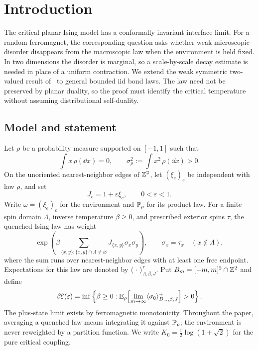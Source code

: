 \section{Introduction}\label{sec:introduction}

The critical planar Ising model has a conformally invariant interface limit.
For a random ferromagnet, the corresponding question asks whether weak
microscopic disorder disappears from the macroscopic law when the environment
is held fixed. In two dimensions the disorder is marginal, so a scale-by-scale
decay estimate is needed in place of a uniform contraction.
We extend the weak symmetric two-valued result of~\cite{R} to general
bounded iid bond laws. The law need not be preserved by planar duality,
so the proof must identify the critical temperature without assuming
distributional self-duality.

\subsection{Model and statement}
Let $\rho$ be a probability measure supported on $[-1,1]$ such that
\begin{equation}\label{eq:law-assumptions}
 \int x\,\rho(\dd x)=0,
 \qquad \sigma_\rho^2:=\int x^2\,\rho(\dd x)>0.
\end{equation}
On the unoriented nearest-neighbor edges of $\mathbb Z^2$, let $(\xi_e)_e$ be
independent with law $\rho$, and set
\begin{equation}\label{eq:bond-model}
 J_e=1+\varepsilon\xi_e,\qquad 0<\varepsilon<1.
\end{equation}
Write $\omega=(\xi_e)_e$ for the environment and $\mathbb P_\rho$ for its product
law. For a finite spin domain $\Lambda$, inverse temperature $\beta\geq0$,
and prescribed exterior spins $\tau$, the quenched Ising law has weight
\[
 \exp\!\left(\beta\sum_{\{x,y\}:\{x,y\}\cap\Lambda\ne\varnothing}
       J_{\{x,y\}}\sigma_x\sigma_y\right),
 \qquad \sigma_x=\tau_x\quad(x\notin\Lambda),
\]
where the sum runs over nearest-neighbor edges with at least one free endpoint.
Expectations for this law are denoted by $\langle\,\cdot\,\rangle^\tau_{
\Lambda,\beta,J}$. Put $B_m=[-m,m]^2\cap\mathbb Z^2$ and define
\begin{equation}\label{eq:critical-definition}
 \beta_c^\rho(\varepsilon)
 =\inf\left\{\beta\geq0:
 \mathbb E_\rho\!\left[\lim_{m\to\infty}
       \langle\sigma_0\rangle^+_{B_m,\beta,J}\right]>0\right\}.
\end{equation}
The plus-state limit exists by ferromagnetic monotonicity. Throughout the
paper, averaging a quenched law means integrating it against $\mathbb P_\rho$;
the environment is never reweighted by a partition function.
We write $K_0=\tfrac12\log(1+\sqrt2)$ for the pure critical coupling.

